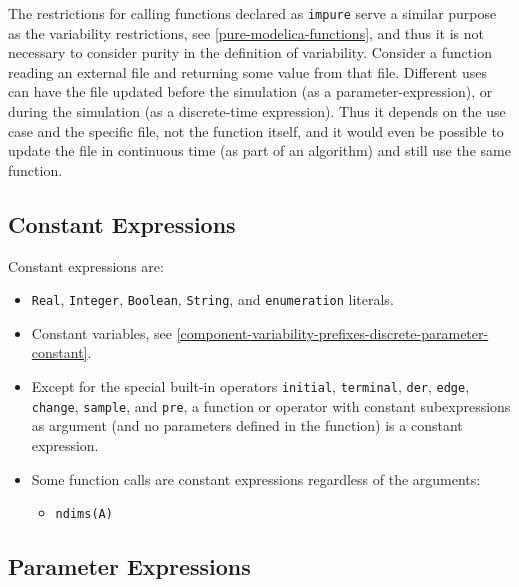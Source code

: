 \begin{nonnormative}
The restrictions for calling functions declared as \lstinline!impure! serve a similar purpose as the variability restrictions, see \cref{pure-modelica-functions}, and thus it is not necessary to consider purity in the definition of variability.
Consider a function reading an external file and returning some value from that file.
Different uses can have the file updated before the simulation (as a parameter-expression), or during the simulation (as a discrete-time expression).
Thus it depends on the use case and the specific file, not the function itself, and it would even be possible to update the file in continuous time (as part of an algorithm) and still use the same function.
\end{nonnormative}

\subsection{Constant Expressions}\label{constant-expressions}

Constant expressions are:
\begin{itemize}
\item
  \lstinline!Real!, \lstinline!Integer!, \lstinline!Boolean!, \lstinline!String!, and \lstinline!enumeration! literals.
\item
  Constant variables, see \cref{component-variability-prefixes-discrete-parameter-constant}.
\item
  Except for the special built-in operators \lstinline!initial!, \lstinline!terminal!, \lstinline!der!,
  \lstinline!edge!, \lstinline!change!, \lstinline!sample!, and \lstinline!pre!, a function or operator with constant
  subexpressions as argument (and no parameters defined in the function)
  is a constant expression.
\item
  Some function calls are constant expressions regardless of the arguments:
  \begin{itemize}
  \item
    \lstinline!ndims(A)!
  \end{itemize}
\end{itemize}

\subsection{Parameter Expressions}\label{parameter-expressions}

